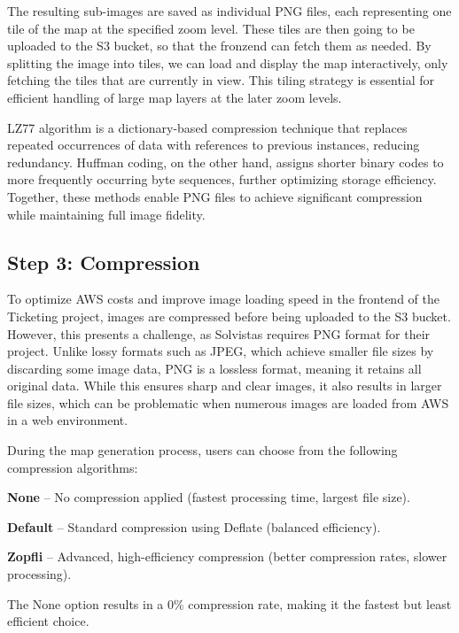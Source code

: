 The resulting sub-images are saved as individual PNG files, each representing one tile of the map at the specified zoom level. These tiles are then going to be uploaded to the S3 bucket, so that the fronzend can fetch them as needed. By splitting the image into tiles, we can load and display the map interactively, only fetching the tiles that are currently in view. This tiling strategy is essential for efficient handling of large map layers at the later zoom levels.

LZ77 algorithm is a dictionary-based compression technique that replaces repeated occurrences of data with references to previous instances, reducing redundancy. Huffman coding, on the other hand, assigns shorter binary codes to more frequently occurring byte sequences, further optimizing storage efficiency. Together, these methods enable PNG files to achieve significant compression while maintaining full image fidelity.

\subsection{Step 3: Compression}

To optimize AWS costs and improve image loading speed in the frontend of the Ticketing project, images are compressed before being uploaded to the S3 bucket. However, this presents a challenge, as Solvistas requires PNG format for their project. Unlike lossy formats such as JPEG, which achieve smaller file sizes by discarding some image data, PNG is a lossless format, meaning it retains all original data. While this ensures sharp and clear images, it also results in larger file sizes, which can be problematic when numerous images are loaded from AWS in a web environment.


During the map generation process, users can choose from the following compression algorithms:

\begin{compactitem}
    
\item{}\textbf{None} – No compression applied (fastest processing time, largest file size).
\item{}\textbf{Default} – Standard compression using Deflate (balanced efficiency).
\item{}\textbf{Zopfli} – Advanced, high-efficiency compression (better compression rates, slower processing).
\end{compactitem}

The None option results in a 0\% compression rate, making it the fastest but least efficient choice.

